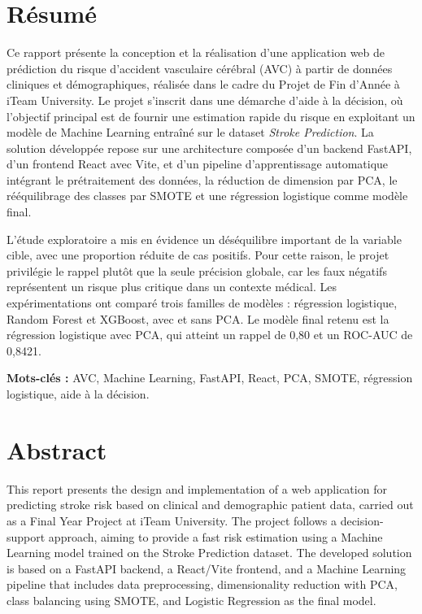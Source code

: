 \documentclass[12pt,a4paper]{report}
\newcommand{\institution}{iTeam University}
\begin{document}
\chapter*{Résumé}
Ce rapport présente la conception et la réalisation d'une application web de prédiction du risque d'accident vasculaire cérébral (AVC) à partir de données cliniques et démographiques, réalisée dans le cadre du Projet de Fin d'Année à \institution. Le projet s'inscrit dans une démarche d'aide à la décision, où l'objectif principal est de fournir une estimation rapide du risque en exploitant un modèle de Machine Learning entraîné sur le dataset \textit{Stroke Prediction}. La solution développée repose sur une architecture composée d'un backend FastAPI, d'un frontend React avec Vite, et d'un pipeline d'apprentissage automatique intégrant le prétraitement des données, la réduction de dimension par PCA, le rééquilibrage des classes par SMOTE et une régression logistique comme modèle final.

L'étude exploratoire a mis en évidence un déséquilibre important de la variable cible, avec une proportion réduite de cas positifs. Pour cette raison, le projet privilégie le rappel plutôt que la seule précision globale, car les faux négatifs représentent un risque plus critique dans un contexte médical. Les expérimentations ont comparé trois familles de modèles : régression logistique, Random Forest et XGBoost, avec et sans PCA. Le modèle final retenu est la régression logistique avec PCA, qui atteint un rappel de 0,80 et un ROC-AUC de 0,8421.

\textbf{Mots-clés :} AVC, Machine Learning, FastAPI, React, PCA, SMOTE, régression logistique, aide à la décision.

\chapter*{Abstract}
This report presents the design and implementation of a web application for predicting stroke risk based on clinical and demographic patient data, carried out as a Final Year Project at \institution. The project follows a decision-support approach, aiming to provide a fast risk estimation using a Machine Learning model trained on the Stroke Prediction dataset. The developed solution is based on a FastAPI backend, a React/Vite frontend, and a Machine Learning pipeline that includes data preprocessing, dimensionality reduction with PCA, class balancing using SMOTE, and Logistic Regression as the final model.
\end{document}
